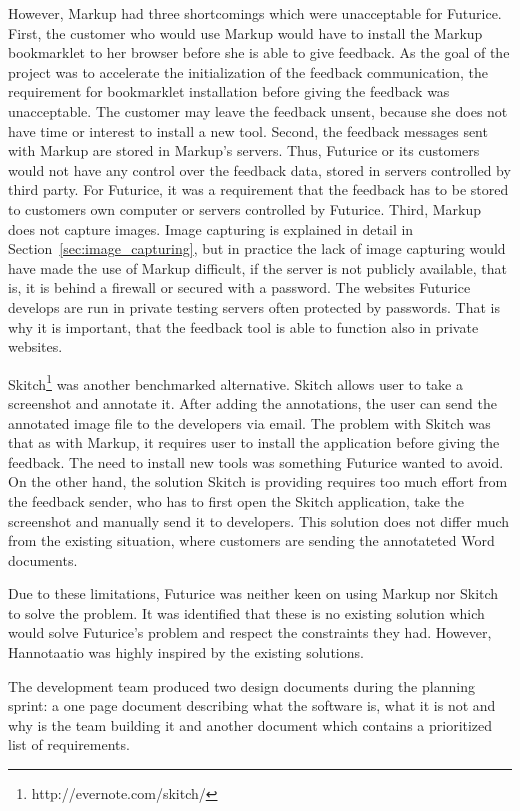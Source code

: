 \documentclass[english,12pt,a4paper,pdftex]{article}
\begin{document}
However, Markup had three shortcomings which were unacceptable for Futurice. First, the customer who would use Markup would have to install the Markup bookmarklet to her browser before she is able to give feedback. As the goal of the project was to accelerate the initialization of the feedback communication, the requirement for bookmarklet installation before giving the feedback was unacceptable. The customer may leave the feedback unsent, because she does not have time or interest to install a new tool. Second, the feedback messages sent with Markup are stored in Markup's servers. Thus, Futurice or its customers would not have any control over the feedback data, stored in servers controlled by third party. For Futurice, it was a requirement that the feedback has to be stored to customers own computer or servers controlled by Futurice. Third, Markup does not capture images. Image capturing is explained in detail in Section~\ref{sec:image_capturing}, but in practice the lack of image capturing would have made the use of Markup difficult, if the server is not publicly available, that is, it is behind a firewall or secured with a password. The websites Futurice develops are run in private testing servers often protected by passwords. That is why it is important, that the feedback tool is able to function also in private websites.

Skitch\footnote{http://evernote.com/skitch/} was another benchmarked alternative. Skitch allows user to take a screenshot and annotate it. After adding the annotations, the user can send the annotated image file to the developers via email. The problem with Skitch was that as with Markup, it requires user to install the application before giving the feedback. The need to install new tools was something Futurice wanted to avoid. On the other hand, the solution Skitch is providing requires too much effort from the feedback sender, who has to first open the Skitch application, take the screenshot and manually send it to developers. This solution does not differ much from the existing situation, where customers are sending the annotateted Word documents.

Due to these limitations, Futurice was neither keen on using Markup nor Skitch to solve the problem. It was identified that these is no existing solution which would solve Futurice's problem and respect the constraints they had. However, Hannotaatio was highly inspired by the existing solutions.

The development team produced two design documents during the planning sprint: a one page document describing what the software is, what it is not and why is the team building it and another document which contains a prioritized list of requirements.
\end{document}
